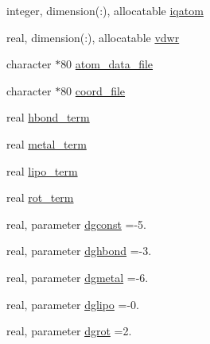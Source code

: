 \begin{DoxyCompactItemize}
\item 
integer, dimension(\-:), allocatable \hyperlink{classcalc__chemscore_ab620b7f585ddb65438bfcf1bd78a83b0}{iqatom}
\item 
real, dimension(\-:), allocatable \hyperlink{classcalc__chemscore_a0a9f262f34f33777a05e38e993df8a66}{vdwr}
\item 
character $\ast$80 \hyperlink{classcalc__chemscore_ae6953c3a16fa9621b6b6c4686a740711}{atom\-\_\-data\-\_\-file}
\item 
character $\ast$80 \hyperlink{classcalc__chemscore_a7e693ad770c136c0edc287994e1f44e2}{coord\-\_\-file}
\item 
real \hyperlink{classcalc__chemscore_a31441c347099258d0b25055878078c9f}{hbond\-\_\-term}
\item 
real \hyperlink{classcalc__chemscore_ad0445c5c5fe8d2e46a1c07680f3d69d1}{metal\-\_\-term}
\item 
real \hyperlink{classcalc__chemscore_a3ba58639189e7f54e3a4d95eff409d27}{lipo\-\_\-term}
\item 
real \hyperlink{classcalc__chemscore_a750abcd708dc4cad10da3fd9b3e3fea2}{rot\-\_\-term}
\item 
real, parameter \hyperlink{classcalc__chemscore_a0700bbed17560b18c8a68cc8ede74f5e}{dgconst} =-\/5.
\item 
real, parameter \hyperlink{classcalc__chemscore_a07cb5cb9cd2c15d9b1339e4212224011}{dghbond} =-\/3.
\item 
real, parameter \hyperlink{classcalc__chemscore_a8e30cdec6eac436e2c66c8042077f8fd}{dgmetal} =-\/6.
\item 
real, parameter \hyperlink{classcalc__chemscore_a56c59d883c700c67655d80f08f9de928}{dglipo} =-\/0.
\item 
real, parameter \hyperlink{classcalc__chemscore_a2ffd6fa0a78e73647da9a04acf90124e}{dgrot} =2.
\end{DoxyCompactItemize}
